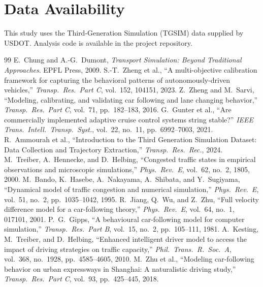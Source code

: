 \documentclass[11pt]{article}
\begin{document}
\section*{Data Availability}
This study uses the Third-Generation Simulation (TGSIM) data supplied by USDOT.
Analysis code is available in the project repository.

\begin{thebibliography}{99}
\small
{} E.\ Chung and A.-G.\ Dumont, \emph{Transport Simulation:
Beyond Traditional Approaches}. EPFL Press, 2009.
 S.-T.\ Zheng et al., ``A multi-objective calibration
framework for capturing the behavioral patterns of autonomously-driven
vehicles,'' \emph{Transp.\ Res.\ Part C}, vol.\ 152, 104151, 2023.
 Z.\ Zheng and M.\ Sarvi, ``Modeling, calibrating, and
validating car following and lane changing behavior,'' \emph{Transp.\ Res.\ Part
C}, vol.\ 71, pp.\ 182--183, 2016.
 G.\ Gunter et al., ``Are commercially implemented adaptive
cruise control systems string stable?'' \emph{IEEE Trans.\ Intell.\ Transp.\
Syst.}, vol.\ 22, no.\ 11, pp.\ 6992--7003, 2021.
 R.\ Ammourah et al., ``Introduction to the Third
Generation Simulation Dataset: Data Collection and Trajectory Extraction,''
\emph{Transp.\ Res.\ Rec.}, 2024.
 M.\ Treiber, A.\ Hennecke, and D.\ Helbing, ``Congested
traffic states in empirical observations and microscopic simulations,''
\emph{Phys.\ Rev.\ E}, vol.\ 62, no.\ 2, 1805, 2000.
 M.\ Bando, K.\ Hasebe, A.\ Nakayama, A.\ Shibata, and Y.\
Sugiyama, ``Dynamical model of traffic congestion and numerical simulation,''
\emph{Phys.\ Rev.\ E}, vol.\ 51, no.\ 2, pp.\ 1035--1042, 1995.
\bibitem{jiang2001} R.\ Jiang, Q.\ Wu, and Z.\ Zhu, ``Full velocity difference
model for a car-following theory,'' \emph{Phys.\ Rev.\ E}, vol.\ 64, no.\ 1,
017101, 2001.
\bibitem{gipps1981} P.\ G.\ Gipps, ``A behavioural car-following model for
computer simulation,'' \emph{Transp.\ Res.\ Part B}, vol.\ 15, no.\ 2, pp.\
105--111, 1981.
\bibitem{kesting2010} A.\ Kesting, M.\ Treiber, and D.\ Helbing, ``Enhanced
intelligent driver model to access the impact of driving strategies on traffic
capacity,'' \emph{Phil.\ Trans.\ R.\ Soc.\ A}, vol.\ 368, no.\ 1928, pp.\
4585--4605, 2010.
\bibitem{zhu2018} M.\ Zhu et al., ``Modeling car-following behavior on urban
expressways in Shanghai: A naturalistic driving study,'' \emph{Transp.\ Res.\
Part C}, vol.\ 93, pp.\ 425--445, 2018.

\end{thebibliography}
\end{document}
